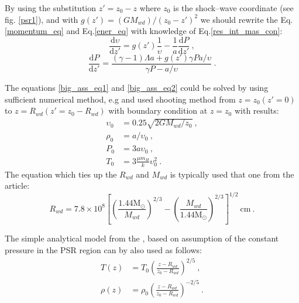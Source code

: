 \documentclass[oneside,a4paper,11pt]{report}
\begin{document}
By using the substitution $z' = z_0 - z$ where $z_0$ is the shock--wave coordinate (see fig. \ref{psr1}),
and with $g(z') = (GM_{wd})/(z_0 - z')^2$ we should rewrite the Eq.\eqref{momentum_eq} and Eq.\eqref{ener_eq} 
with knowledge of Eq.\eqref{res_int_mas_con}:
\begin{equation}
 \label{big_ass_eq1}
\frac{\mathrm{d} \upsilon}{\mathrm{d} z'} = g(z')\frac{1}{\upsilon}-\frac{1}{a}\frac{\mathrm{d}P}{\mathrm{d}z'} \:,
\end{equation}
\begin{equation}
 \label{big_ass_eq2}
\frac{\mathrm{d}P}{\mathrm{d}z'} = \frac{(\gamma -1) \Lambda a + g(z')\gamma Pa / \upsilon}{\gamma P -a / \upsilon } \:.
\end{equation}

The equations \eqref{big_ass_eq1} and \eqref{big_ass_eq2} could be solved by using sufficient 
numerical method, e.g \citet{2005A&A...435..191S} and  \citet{1999MNRAS.306..684C} used shooting 
method from $z=z_0(z'=0)$ to $z = R_{wd}(z'=z_0-R_{wd})$ with boundary condition at $z=z_0$ with results:
\begin{equation}
 \label{res_shoot}
\begin{split}
\upsilon_0 &= 0.25\sqrt{2GM_{wd}/z_0}\:,\\
\rho_0 &= a / \upsilon_0\:,\\
P_0 &= 3a\upsilon_0\:,\\
T_0 &= 3\frac{\mu m_H}{k}\upsilon_0^2\:. 
\end{split}
\end{equation}
The equation which ties up the $R_{wd}$ and $M_{wd}$ is typically used that one from 
the \citet{1972ApJ...175..417N} article:
\begin{equation}
 \label{rwd_mwd}
R_{wd} = 7.8 \times 10^8 \left[ \left( \frac{1.44\mathrm{M_\odot}}{M_{wd}} \right)^{2/3} -\left( \frac{M_{wd}}{1.44\mathrm{M_\odot}} \right)^{2/3} \right]^{1/2}\:\mathrm{cm}\:.
\end{equation}

The simple analytical model from the \citet{accpower:1}, based on assumption of the constant pressure 
in the PSR region can by also used as follows:
\begin{equation}
 \label{king_ana}
\begin{split}
T(z) &= T_0 \left( \frac{z - R_{wd}}{z_0 - R_{wd}}\right)^{2/5}\:,\\
\rho(z) &= \rho_0 \left( \frac{z - R_{wd}}{z_0 - R_{wd}}\right)^{-2/5}\:.
\end{split}
\end{equation}
\end{document}
